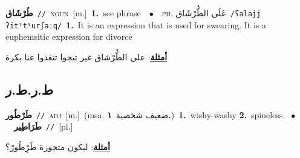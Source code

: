 \documentclass[10pt,a4paper,twoside]{article} %
\begin{document}
\begin{multicols}{2}
{\setlength\topsep{0pt}\textbf{\foreignlanguage{arabic}{طُرْشَاق}}\ {\color{gray}\texttt{//}\color{black}}\ \textsc{noun}\ [m.]\ \textbf{1.}~see phrase\ \ $\bullet$\ \ \textsc{ph.} \color{gray} \foreignlanguage{arabic}{عَلَي الطُّرْشَاق}\color{black}\ {\color{gray}\texttt{/{\sffamily ʕalajj ʔitˤtˤurʃaːq}/}\color{black}}\ \textbf{1.}~It is an expression that is used for swearing. It is a euphemsitic expression for divorce\  \begin{flushright}\color{gray}\foreignlanguage{arabic}{\textbf{\underline{\foreignlanguage{arabic}{أمثلة}}}: علي الطُّرْشاق غير تيجوا تتغدوا عنا بكرة}\end{flushright}\color{black}} \vspace{2mm}

\vspace{-3mm}
\subsection*{\color{blue}\foreignlanguage{arabic}{ط.ر.ط.ر}\color{blue}{}} 

{\setlength\topsep{0pt}\textbf{\foreignlanguage{arabic}{طَرْطُور}}\ {\color{gray}\texttt{//}\color{black}}\ \textsc{adj}\ [m.]\ \color{gray}(msa. \foreignlanguage{arabic}{ضعيف شخصية}~\foreignlanguage{arabic}{\textbf{١.}})\color{black}\ \textbf{1.}~wishy-washy  \textbf{2.}~spineless\ \ $\bullet$\ \ \setlength\topsep{0pt}\textbf{\foreignlanguage{arabic}{طَرَاطِير}}\ {\color{gray}\texttt{//}\color{black}}\ [pl.]\  \begin{flushright}\color{gray}\foreignlanguage{arabic}{\textbf{\underline{\foreignlanguage{arabic}{أمثلة}}}: ليكون متجوزة طَرِْطُورْ؟}\end{flushright}\color{black}} \vspace{2mm}


\end{multicols}
\end{document}
